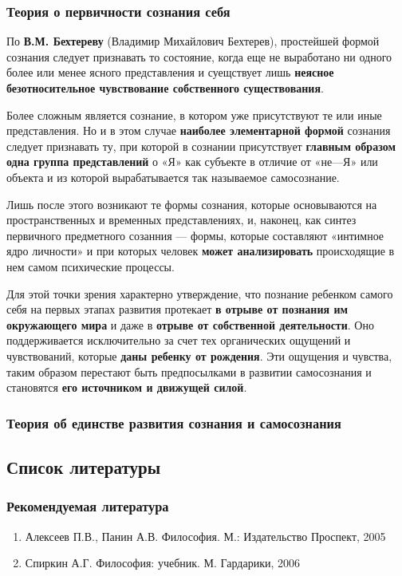 \documentclass{article}
\begin{document}
\subsubsection{Теория о первичности сознания себя}

\begin{flushleft}

По \textbf{В.М. Бехтереву} (Владимир Михайлович Бехтерев), простейшей формой сознания следует признавать то состояние, когда еще не выработано ни одного более или менее ясного представления и суещствует лишь \textbf{неясное безотносительное чувствование собственного существования}.

Более сложным является сознание, в котором уже присутствуют те или иные представления. Но и в этом случае \textbf{наиболее элементарной формой} сознания следует признавать ту, при которой в сознании присутствует \textbf{главным образом одна группа представлений} о «Я» как субъекте в отличие от «не—Я» или объекта и из которой вырабатывается так называемое самосознание.

Лишь после этого возникают те формы сознания, которые основываются на пространственных и временных представлениях, и, наконец, как синтез первичного предметного созанния — формы, которые составляют «интимное ядро личности» и при которых человек \textbf{может анализировать} происходящие в нем самом психические процессы.

Для этой точки зрения характерно утверждение, что познание ребенком самого себя на первых этапах развития протекает \textbf{в отрыве от познания им окружающего мира} и даже в \textbf{отрыве от собственной деятельности}. Оно поддерживается исключительно за счет тех органических ощущений и чувствований, которые \textbf{даны ребенку от рождения}. Эти ощущения и чувства, таким образом перестают быть предпосылками в развитии самосознания и становятся \textbf{его источником и движущей силой}.

\end{flushleft}

\subsubsection{Теория об единстве развития сознания и самосознания}

\subsection{Список литературы}

\subsubsection{Рекомендуемая литература}

\begin{enumerate}
    \item Алексеев П.В., Панин А.В. Философия. М.: Издательство Проспект, 2005
    \item Спиркин А.Г. Философия: учебник. М. Гардарики, 2006
\end{enumerate}
\end{document}
